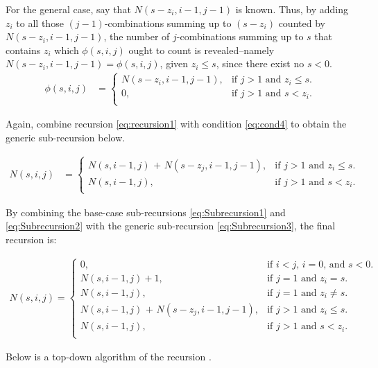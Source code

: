 \documentclass[a4paper]{article}
\begin{document}
For the general case, say that $N(s - z_{i},i-1,j-1)$ is known. Thus, by adding $z_{i}$ to all those $(j-1)$-combinations summing up to $(s - z_{i})$ counted by $N(s - z_{i},i-1,j-1)$, the number of $j$-combinations summing up to $s$ that contains $z_{i}$ which $\phi (s,i,j)$ ought to count is revealed–namely $N(s - z_{i},i-1,j-1)=\phi (s,i,j)$, given $z_{i} \leq s$, since there exist no $s<0$.
\begin{align}
\label{eq:cond4}
\phi (s,i,j) &=\begin{cases}
    N(s - z_{i},i-1,j-1), & \text{if $j>1$ and $z_{i} \leq s$}.\\
    0, & \text{if $j>1$ and $s < z_{i}$}.\\
  \end{cases}
\end{align}

Again, combine recursion \ref{eq:recursion1} with condition \ref{eq:cond4} to obtain the generic sub-recursion below.

\begin{align}
\label{eq:Subrecursion3}
N(s,i,j) &=\begin{cases}
    \text{$N(s,i-1,j)$ + $N(s-z_{j},i-1,j-1)$}, & \text{if $j>1$ and $z_{i} \leq s$}.\\
    \text{$N(s,i-1,j)$}, & \text{if $j>1$ and $s < z_{i}$}.\\
  \end{cases}
\end{align}

By combining the base-case sub-recursions \ref{eq:Subrecursion1} and \ref{eq:Subrecursion2} with the generic sub-recursion \ref{eq:Subrecursion3}, the final recursion is:

\begin{align}
\label{eq:finalRecursion}
\text{$N(s,i,j)$}   =\begin{cases}
    0, & \text{if $i < j$, $i=0$, and $s < 0$.} \\
    \text{$N(s,i-1,j)$}+1, & \text{if $j=1$ and $z_{i}=s$}.\\
    \text{$N(s,i-1,j)$}, & \text{if $j=1$ and $z_{i}\neq s$}. \\
    \text{$N(s,i-1,j)$ + $N(s-z_{j},i-1,j-1)$}, & \text{if $j>1$ and $z_{i} \leq s$}. \\
    \text{$N(s,i-1,j)$}, & \text{if $j>1$ and $s < z_{i}$}. \\
  \end{cases}
\end{align}

Below is a top-down algorithm of the recursion \label{eq:finalRecursion}.
\end{document}
